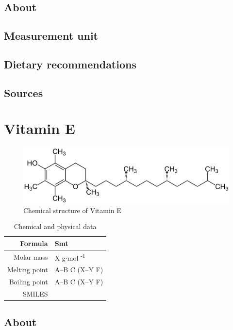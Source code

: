 \documentclass{book}
\begin{document}
\section{About}


\section{Measurement unit}


\section{Dietary recommendations}


\section{Sources}


\chapter{Vitamin E}
\begin{figure}[h]
	\caption{Chemical structure of Vitamin E}
	\centering \includegraphics[width=\textwidth]{images/Vitamin_E_chemical_structure}
\end{figure}

\begin{table}[h]
	\caption{Chemical and physical data}
	\centering \begin{tabular}{| r | l |}
		\hline
		Formula & Smt\\ \hline
		Molar mass & X g$\cdot$mol \textsuperscript{-1}\\ \hline
		Melting point & A--B \degree C (X--Y \degree F)\\ \hline
		Boiling point & A--B \degree C (X--Y \degree F)\\ \hline
		SMILES & \\ \hline
	\end{tabular}
\end{table}
\newpage

\section{About}
\end{document}
